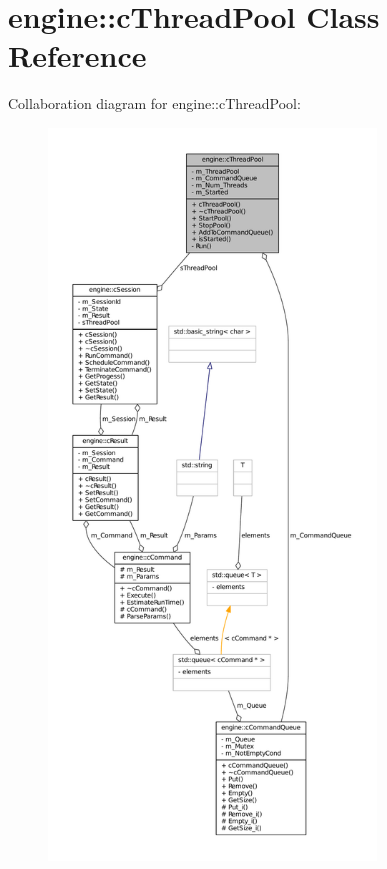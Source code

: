 \hypertarget{classengine_1_1cThreadPool}{
\section{engine\-:\-:c\-Thread\-Pool \-Class \-Reference}
\label{classengine_1_1cThreadPool}
}


\-Collaboration diagram for engine\-:\-:c\-Thread\-Pool\-:\nopagebreak
\begin{figure}[H]
\begin{center}
\leavevmode
\includegraphics[height=550pt]{classengine_1_1cThreadPool__coll__graph}
\end{center}
\end{figure}
